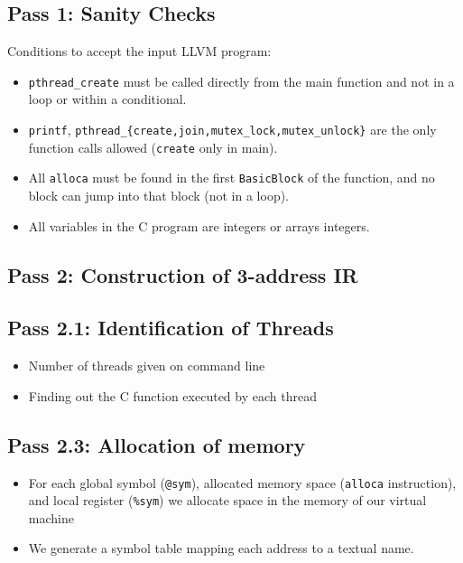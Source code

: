 \documentclass{llncs}
\begin{document}
\subsection*{Pass 1: Sanity Checks}

Conditions to accept the input LLVM program:

\begin{itemize}
\item
  \verb!pthread_create! must be called directly from the main function and not
  in a loop or within a conditional.
\item
  \verb!printf!,
  \verb!pthread_{create,join,mutex_lock,mutex_unlock}! are the only function calls
  allowed (\verb!create! only in main).
\item
  All \verb!alloca! must be found in the first \verb!BasicBlock! of the
  function, and no block can jump into that block (not in a loop).
\item
  All variables in the C program are integers or arrays integers.
\end{itemize}

\subsection*{Pass 2: Construction of 3-address IR}

\subsection*{Pass 2.1: Identification of Threads}

\begin{itemize}
\item Number of threads given on command line
\item Finding out the C function executed by each thread
\end{itemize}

\subsection*{Pass 2.3: Allocation of memory}

\begin{itemize}
\item
  For each global symbol (\verb!@sym!), allocated memory space (\verb!alloca!
  instruction), and local register (\verb!%sym!) we allocate space in the
  memory of our virtual machine
\item
  We generate a symbol table mapping each address to a textual name.
\end{itemize}
\end{document}
